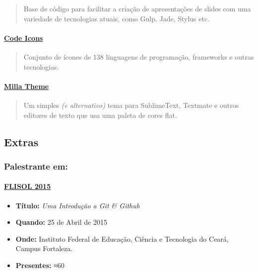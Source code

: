 \documentclass[]{article}
\providecommand{\tightlist}{%
  \setlength{\itemsep}{0pt}\setlength{\parskip}{0pt}}
\let\oldparagraph\paragraph
\renewcommand{\paragraph}[1]{\oldparagraph{#1}\mbox{}}
\begin{document}
\begin{quote}
Base de código para facilitar a criação de apresentações de slides com
uma variedade de tecnologias atuais, como Gulp, Jade, Stylus etc.
\end{quote}

\paragraph{\texorpdfstring{\href{https://github.com/mabrasil/codeicons}{Code
Icons}}{Code Icons}}\label{code-icons}

\begin{quote}
Conjunto de ícones de 138 linguagens de programação, frameworks e outras
tecnologias.
\end{quote}

\paragraph{\texorpdfstring{\href{https://github.com/mabrasil/milla-theme}{Milla
Theme}}{Milla Theme}}\label{milla-theme}

\begin{quote}
Um simples \emph{(e alternativo)} tema para SublimeText, Textmate e
outros editores de texto que usa uma paleta de cores flat.
\end{quote}

\subsection{Extras}\label{extras}

\subsubsection{Palestrante em:}\label{palestrante-em}

\paragraph{\texorpdfstring{\href{http://flisolce.org/}{FLISOL
2015}}{FLISOL 2015}}\label{flisol-2015}

\begin{itemize}
\tightlist
\item
  \textbf{Título:} \emph{Uma Introdução a Git \& Github}
\item
  \textbf{Quando:} 25 de Abril de 2015
\item
  \textbf{Onde:} Instituto Federal de Educação, Ciência e Tecnologia do
  Ceará, Campus Fortaleza.
\item
  \textbf{Presentes:} ≈60
\end{itemize}
\end{document}
